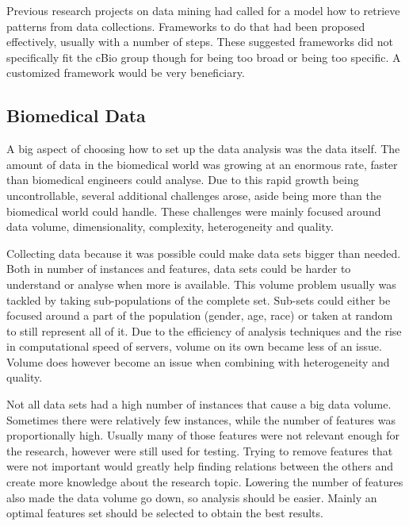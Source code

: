 \documentclass[10pt,a4paper]{article}
\begin{document}
	Previous research projects on data mining had called for a model how to retrieve patterns from data collections. Frameworks to do that had been proposed effectively, usually with a number of steps.\cite{CIOS20021} These suggested frameworks did not specifically fit the cBio group though for being too broad\cite{fayyad1996knowledge} or being too specific.\cite{cios2000knowledge} A customized framework would be very beneficiary. 
	
	\subsection{Biomedical Data}
	\label{subsec:BiomedicalData}
	
	A big aspect of choosing how to set up the data analysis was the data itself. The amount of data in the biomedical world was growing at an enormous rate, faster than biomedical engineers could analyse. Due to this rapid growth being uncontrollable, several additional challenges arose, aside being more than the biomedical world could handle. These challenges were mainly focused around data volume, dimensionality, complexity, heterogeneity and quality.\cite{chen2006medical, doi:10.1093/bib/bbx044}
	
	Collecting data because it was possible could make data sets bigger than needed. Both in number of instances and features, data sets could be harder to understand or analyse when more is available.\cite{chen2006medical} This volume problem usually was tackled by taking sub-populations of the complete set. Sub-sets could either be focused around a part of the population (gender, age, race) or taken at random to still represent all of it. Due to the efficiency of analysis techniques and the rise in computational speed of servers\cite{blythe2008rise}, volume on its own became less of an issue. Volume does however become an issue when combining with heterogeneity and quality. \cite{Turkay2014, Holzinger2014} 
	
	Not all data sets had a high number of instances that cause a big data volume. Sometimes there were relatively few instances, while the number of features was proportionally high.\cite{dubitzky2007fundamentals} Usually many of those features were not relevant enough for the research, however were still used for testing. Trying to remove features that were not important would greatly help finding relations between the others and create more knowledge about the research topic. Lowering the number of features also made the data volume go down, so analysis should be easier. Mainly an optimal features set should be selected to obtain the best results.\cite{PENG201015}
	
\end{document}
